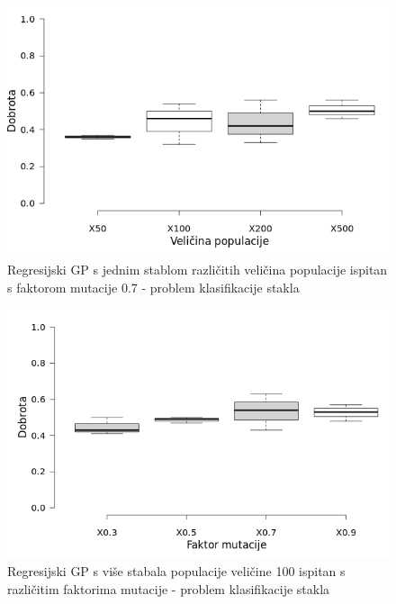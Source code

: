 \documentclass[times, utf8, zavrsni]{fer}
\begin{document}
\begin{figure}[htb]
\centering
\includegraphics[scale=0.5]{grafovi/boxplotGlassS}
\caption{Regresijski GP s jednim stablom različitih veličina populacije ispitan s faktorom mutacije 0.7 - problem klasifikacije stakla}
\end{figure}

\begin{figure}[htb]
\centering
\includegraphics[scale=0.5]{grafovi/boxplotGlassMTest}
\caption{Regresijski GP s više stabala populacije veličine 100 ispitan s različitim faktorima mutacije - problem klasifikacije stakla}
\end{figure}
\end{document}
